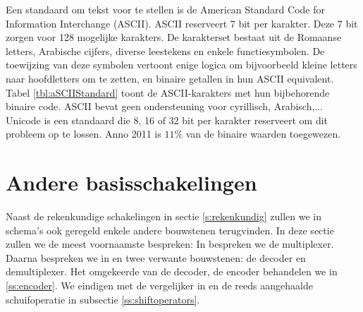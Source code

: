 Een standaard om tekst voor te stellen is de American Standard Code for Information Interchange (ASCII). ASCII reserveert 7 bit per karakter. Deze 7 bit zorgen voor 128 mogelijke karakters. De karakterset bestaat uit de Romaanse letters, Arabische cijfers, diverse leestekens en enkele functiesymbolen. De toewijzing van deze symbolen vertoont enige logica om bijvoorbeeld kleine letters naar hoofdletters om te zetten, en binaire getallen in hun ASCII equivalent. Tabel \ref{tbl:aSCIIStandard} toont de ASCII-karakters met hun bijbehorende binaire code. ASCII bevat geen ondersteuning voor cyrillisch, Arabisch,... Unicode is een standaard die 8, 16 of 32 bit per karakter reserveert om dit probleem op te lossen. Anno 2011 is $11\%$ van de binaire waarden toegewezen.
\section{Andere basisschakelingen}
Naast de rekenkundige schakelingen in sectie \ref{s:rekenkundig} zullen we in schema's ook geregeld enkele andere bouwstenen terugvinden. In deze sectie zullen we de meest voornaamste bespreken: In  bespreken we de multiplexer. Daarna bespreken we in  en  twee verwante bouwstenen: de decoder en demultiplexer. Het omgekeerde van de decoder, de encoder behandelen we in \ref{ss:encoder}. We eindigen met de vergelijker in  en de reeds aangehaalde schuifoperatie in subsectie \ref{ss:shiftoperators}.
